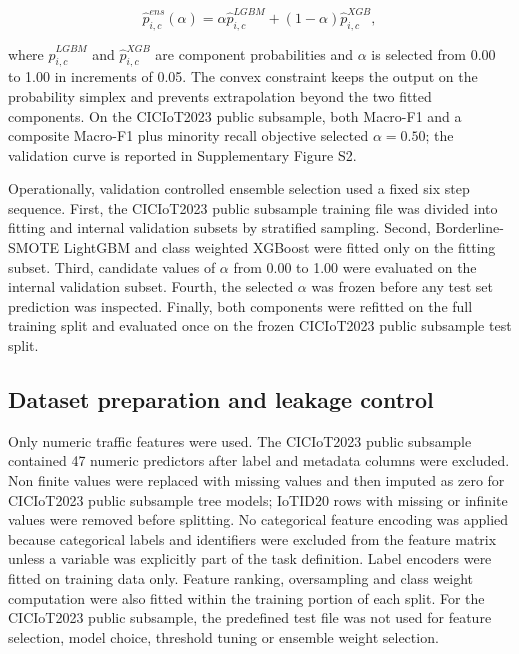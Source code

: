 \documentclass[fleqn,10pt]{wlscirep}
\begin{document}
\begin{equation}
\hat{p}_{i,c}^{ens}(\alpha)
=
\alpha \hat{p}_{i,c}^{LGBM}
+
(1-\alpha)\hat{p}_{i,c}^{XGB},
\label{eq:ensemble}
\end{equation}

where $\hat{p}_{i,c}^{LGBM}$ and $\hat{p}_{i,c}^{XGB}$ are component probabilities and $\alpha$ is selected from 0.00 to 1.00 in increments of 0.05. The convex constraint keeps the output on the probability simplex and prevents extrapolation beyond the two fitted components. On the CICIoT2023 public subsample, both Macro-F1 and a composite Macro-F1 plus minority recall objective selected $\alpha=0.50$; the validation curve is reported in Supplementary Figure S2.

Operationally, validation controlled ensemble selection used a fixed six step sequence. First, the CICIoT2023 public subsample training file was divided into fitting and internal validation subsets by stratified sampling. Second, Borderline-SMOTE LightGBM and class weighted XGBoost were fitted only on the fitting subset. Third, candidate values of $\alpha$ from 0.00 to 1.00 were evaluated on the internal validation subset. Fourth, the selected $\alpha$ was frozen before any test set prediction was inspected. Finally, both components were refitted on the full training split and evaluated once on the frozen CICIoT2023 public subsample test split.

\subsection*{Dataset preparation and leakage control}

Only numeric traffic features were used. The CICIoT2023 public subsample contained 47 numeric predictors after label and metadata columns were excluded. Non finite values were replaced with missing values and then imputed as zero for CICIoT2023 public subsample tree models; IoTID20 rows with missing or infinite values were removed before splitting. No categorical feature encoding was applied because categorical labels and identifiers were excluded from the feature matrix unless a variable was explicitly part of the task definition. Label encoders were fitted on training data only. Feature ranking, oversampling and class weight computation were also fitted within the training portion of each split. For the CICIoT2023 public subsample, the predefined test file was not used for feature selection, model choice, threshold tuning or ensemble weight selection.
\end{document}

